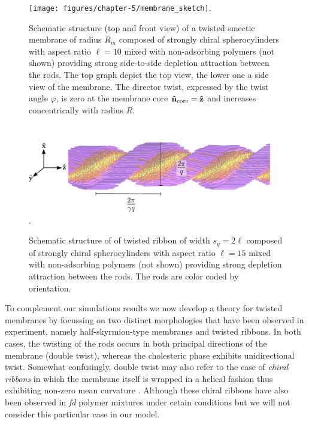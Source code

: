\begin{figure}
\texttt{[image: figures/chapter-5/membrane\_sketch]}.
\caption{ \label{memsnap} Schematic structure (top and front view) of a twisted smectic membrane of radius $R_{m}$ composed of strongly chiral spherocylinders with aspect ratio $\ell = 10$ mixed with non-adsorbing polymers (not shown) providing strong side-to-side depletion attraction between the rods.  The top graph depict the top view, the lower one a side view of the membrane. The director twist, expressed by the twist angle $\varphi$, is zero at  the membrane  core ${\bf \hat{n}} _{\rm core} = {\bf \hat{z}}$ and increases concentrically with radius $R$.}
\end{figure}




\begin{figure}
\begin{center}
\includegraphics[width= \columnwidth]{figures/chapter-5/ribbon_sketch}.
\caption{ \label{ribsnap} Schematic structure of of twisted ribbon of width $s_y=2\ell$ composed of strongly chiral spherocylinders with aspect ratio $\ell = 15$ mixed with non-adsorbing polymers (not shown) providing strong depletion attraction between the rods. The rods are color coded by orientation.  }
\end{center}
\end{figure}


 To complement our simulations results we now develop a theory for twisted membranes by focussing on two distinct morphologies that have been observed in experiment, namely half-skyrmion-type membranes and twisted ribbons. In both cases, the twisting of the rods occurs in both principal directions of the membrane (double twist), whereas the cholesteric phase exhibits unidirectional twist. Somewhat confusingly, double twist may also refer to the case of {\em chiral ribbons} in which the membrane itself is wrapped 
in a helical fashion thus exhibiting non-zero mean curvature \cite{green1936equilibrium,chopin2016roadmap}. Although these chiral ribbons have also been observed in {\em fd} polymer mixtures under cetain conditions \cite{Gibaud2014} but we will not consider this particular case in our model. 
 
